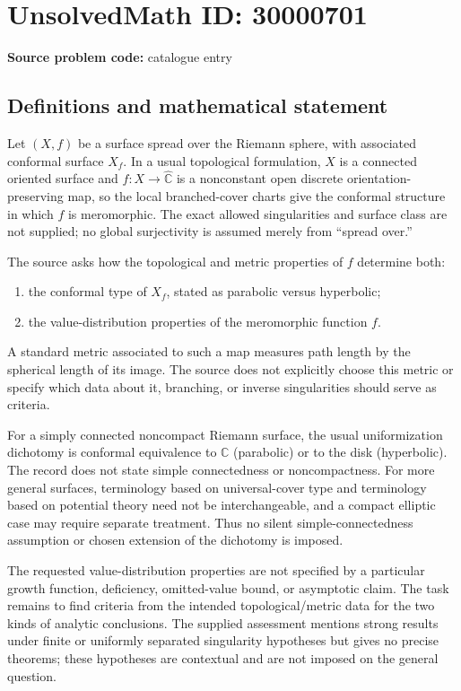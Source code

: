 \documentclass[11pt]{article}
\newcommand{\C}{\mathbb{C}}
\begin{document}
\section*{UnsolvedMath ID: 30000701}
\textbf{Source problem code:} catalogue entry
\subsection{Definitions and mathematical statement}
Let $(X,f)$ be a surface spread over the Riemann sphere, with associated conformal surface $X_f$. In a usual topological formulation, $X$ is a connected oriented surface and $f:X\to\widehat{\C}$ is a nonconstant open discrete orientation-preserving map, so the local branched-cover charts give the conformal structure in which $f$ is meromorphic. The exact allowed singularities and surface class are not supplied; no global surjectivity is assumed merely from ``spread over.''

The source asks how the topological and metric properties of $f$ determine both:
\begin{enumerate}
\item the conformal type of $X_f$, stated as parabolic versus hyperbolic;
\item the value-distribution properties of the meromorphic function $f$.
\end{enumerate}
A standard metric associated to such a map measures path length by the spherical length of its image. The source does not explicitly choose this metric or specify which data about it, branching, or inverse singularities should serve as criteria.

For a simply connected noncompact Riemann surface, the usual uniformization dichotomy is conformal equivalence to $\C$ (parabolic) or to the disk (hyperbolic). The record does not state simple connectedness or noncompactness. For more general surfaces, terminology based on universal-cover type and terminology based on potential theory need not be interchangeable, and a compact elliptic case may require separate treatment. Thus no silent simple-connectedness assumption or chosen extension of the dichotomy is imposed.

The requested value-distribution properties are not specified by a particular growth function, deficiency, omitted-value bound, or asymptotic claim. The task remains to find criteria from the intended topological/metric data for the two kinds of analytic conclusions. The supplied assessment mentions strong results under finite or uniformly separated singularity hypotheses but gives no precise theorems; these hypotheses are contextual and are not imposed on the general question.
\end{document}
